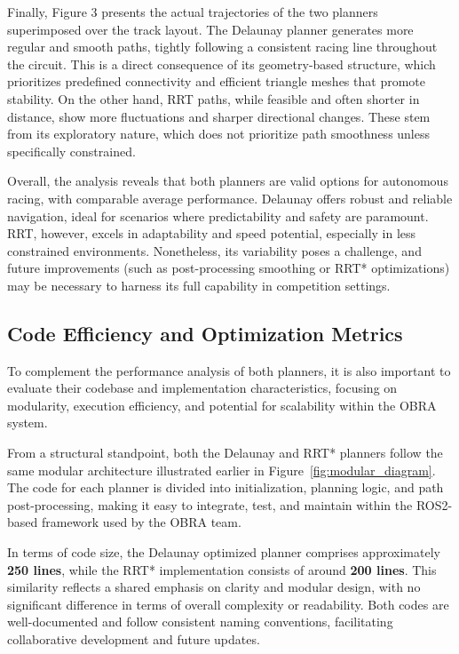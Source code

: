 \documentclass[a4paper,11pt]{report}
\begin{document}
Finally, Figure 3 presents the actual trajectories of the two planners superimposed over the track layout. The Delaunay planner generates more regular and smooth paths, tightly following a consistent racing line throughout the circuit. This is a direct consequence of its geometry-based structure, which prioritizes predefined connectivity and efficient triangle meshes that promote stability. On the other hand, RRT paths, while feasible and often shorter in distance, show more fluctuations and sharper directional changes. These stem from its exploratory nature, which does not prioritize path smoothness unless specifically constrained.

Overall, the analysis reveals that both planners are valid options for autonomous racing, with comparable average performance. Delaunay offers robust and reliable navigation, ideal for scenarios where predictability and safety are paramount. RRT, however, excels in adaptability and speed potential, especially in less constrained environments. Nonetheless, its variability poses a challenge, and future improvements (such as post-processing smoothing or RRT* optimizations) may be necessary to harness its full capability in competition settings.


\subsection{Code Efficiency and Optimization Metrics}

To complement the performance analysis of both planners, it is also important to evaluate their codebase and implementation characteristics, focusing on modularity, execution efficiency, and potential for scalability within the OBRA system.

From a structural standpoint, both the Delaunay and RRT* planners follow the same modular architecture illustrated earlier in Figure~\ref{fig:modular_diagram}. The code for each planner is divided into initialization, planning logic, and path post-processing, making it easy to integrate, test, and maintain within the ROS2-based framework used by the OBRA team.

In terms of code size, the Delaunay optimized planner comprises approximately \textbf{250 lines}, while the RRT* implementation consists of around \textbf{200 lines}. This similarity reflects a shared emphasis on clarity and modular design, with no significant difference in terms of overall complexity or readability. Both codes are well-documented and follow consistent naming conventions, facilitating collaborative development and future updates.
\end{document}
